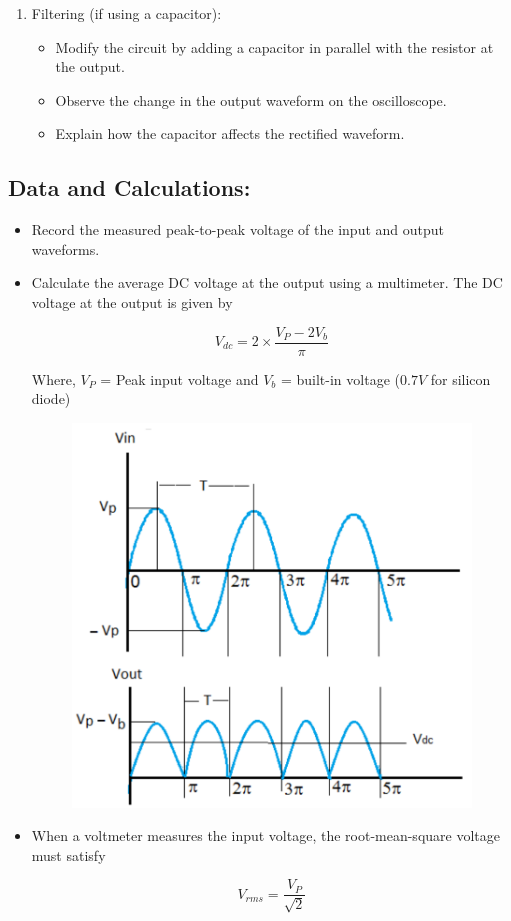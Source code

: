 \begin{enumerate}
    \item Filtering (if using a capacitor):
    \begin{itemize}
        \item Modify the circuit by adding a capacitor in parallel with the resistor at the output.
        \item Observe the change in the output waveform on the oscilloscope.
        \item Explain how the capacitor affects the rectified waveform.
    \end{itemize}
\end{enumerate}

\subsection*{Data and Calculations:}
\begin{itemize}
    \item Record the measured peak-to-peak voltage of the input and output waveforms.   
    \item Calculate the average DC voltage at the output using a multimeter. The DC voltage at the output is given by

    $$ V_{dc} = 2 \times \frac{V_P - 2V_b} {\pi} $$

    Where, $V_P$ = Peak input voltage and $V_b$ = built-in voltage ($0.7V$ for silicon diode)

    \begin{figure}
        \centering
        \includegraphics[width=0.5\linewidth]{img/full_wave_form.png}
        \label{fig:full_wave_form}
    \end{figure}

    \item When a voltmeter measures the input voltage, the root-mean-square voltage must satisfy

    $$V_{rms} = \frac{V_P}{\sqrt{2}}$$
\end{itemize}

